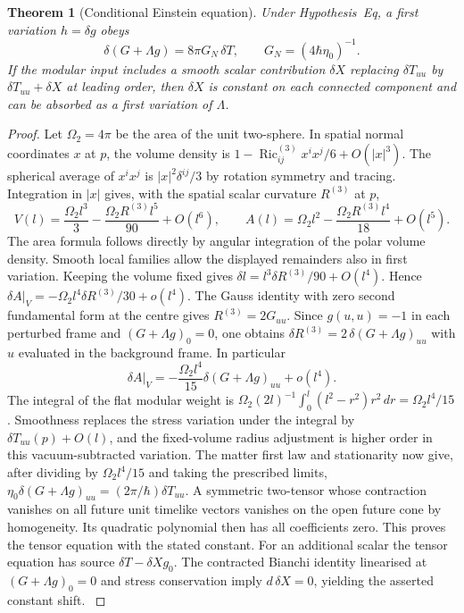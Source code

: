 \documentclass[aps,pra,onecolumn,superscriptaddress,nofootinbib,10pt]{revtex4-2}
\newtheorem{theorem}{Theorem}
\theoremstyle{definition}
\theoremstyle{remark}
\begin{document}
\begin{theorem}[Conditional Einstein equation]\label{ub:einstein}
Under Hypothesis~Eq, a first variation $h=\delta g$
obeys
\[
 \delta(G+\Lambda g)=8\pi G_N\,\delta T,\qquad
 G_N=(4\hbar\eta_0)^{-1}.
\]
If the modular input includes a smooth scalar contribution
$\delta X$ replacing $\delta T_{uu}$ by $\delta T_{uu}+\delta X$ at
leading order, then $\delta X$ is constant on each connected
component and can be absorbed as a first variation of $\Lambda$.
\end{theorem}
\begin{proof}
Let $\Omega_2=4\pi$ be the area of the unit two-sphere. In spatial
normal coordinates $x$ at $p$, the volume density is
$1-\operatorname{Ric}^{(3)}_{ij}x^ix^j/6+O(|x|^3)$.
The spherical average of $x^ix^j$ is
$|x|^2\delta^{ij}/3$ by rotation symmetry and tracing.
Integration in $|x|$ gives, with the spatial scalar curvature
$R^{(3)}$ at $p$,
\[
 V(l)=\frac{\Omega_2 l^3}{3}-\frac{\Omega_2 R^{(3)}l^5}{90}+O(l^6),
 \qquad
 A(l)=\Omega_2 l^2-\frac{\Omega_2 R^{(3)}l^4}{18}+O(l^5).
\]
The area formula follows directly by angular integration of the
polar volume density. Smooth local families allow the displayed
remainders also in first variation.
Keeping the volume fixed gives
$\delta l= l^3\delta R^{(3)}/90+O(l^4)$.
Hence $\delta A|_V=-\Omega_2 l^4\delta R^{(3)}/30+o(l^4)$.
The Gauss identity with zero second fundamental form at the centre
gives $R^{(3)}=2G_{uu}$. Since $g(u,u)=-1$ in each perturbed
frame and $(G+\Lambda g)_0=0$, one obtains
$\delta R^{(3)}=2\,\delta(G+\Lambda g)_{uu}$ with $u$ evaluated
in the background frame. In particular
\[
 \delta A|_V=-\frac{\Omega_2 l^4}{15}\delta(G+\Lambda g)_{uu}
                 +o(l^4).
\]
The integral of the flat modular weight is
$\Omega_2(2l)^{-1}\int_0^l (l^2-r^2)r^2\,dr
=\Omega_2 l^4/15$.
Smoothness replaces the stress variation under the integral by
$\delta T_{uu}(p)+O(l)$, and the fixed-volume radius adjustment is
higher order in this vacuum-subtracted variation. The matter first
law and stationarity now give, after dividing by $\Omega_2 l^4/15$
and taking the prescribed limits,
$\eta_0\delta(G+\Lambda g)_{uu}=(2\pi/\hbar)\delta T_{uu}$.
A symmetric two-tensor whose contraction vanishes on all future
unit timelike vectors vanishes on the open future cone by
homogeneity. Its quadratic polynomial then has all coefficients
zero. This proves the tensor equation with the stated constant.
For an additional scalar the tensor equation has source
$\delta T-\delta Xg_0$. The contracted Bianchi identity linearised
at $(G+\Lambda g)_0=0$ and stress conservation imply
$d\,\delta X=0$, yielding the asserted constant shift.
\cite{ub:jac16,n1-jacobson}
\end{proof}
\end{document}
